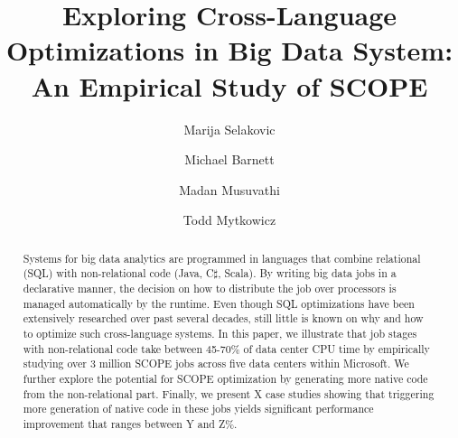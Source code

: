 \documentclass[sigconf, anonymous]{acmart}
\begin{document}
\title{Exploring Cross-Language Optimizations in Big Data System: An Empirical Study of SCOPE}


\author{Marija Selakovic}


\author{Michael Barnett}


\author{Madan Musuvathi}


  



\author{Todd Mytkowicz}


  


\renewcommand{\shortauthors}{M. Selakovic et al.}


\begin{abstract}

Systems for big data analytics are programmed in languages that combine relational (SQL) with non-relational code (Java, C$\sharp$, Scala).
By writing big data jobs in a declarative manner,
the decision on how to distribute the job over processors is managed automatically by the runtime.
Even though SQL optimizations have been extensively researched over past several decades,
still  little is known on why and how to optimize such cross-language systems.
In this paper, we illustrate that job stages with non-relational code take between 45-70\% of data center CPU time by empirically studying over
3 million SCOPE jobs across five data centers within Microsoft.
We further explore the potential for SCOPE optimization by generating more native code from the non-relational part.
Finally, we present X case studies showing that triggering more generation of native code in these jobs yields significant performance improvement that ranges between Y and Z\%.

\end{abstract}
\end{document}
